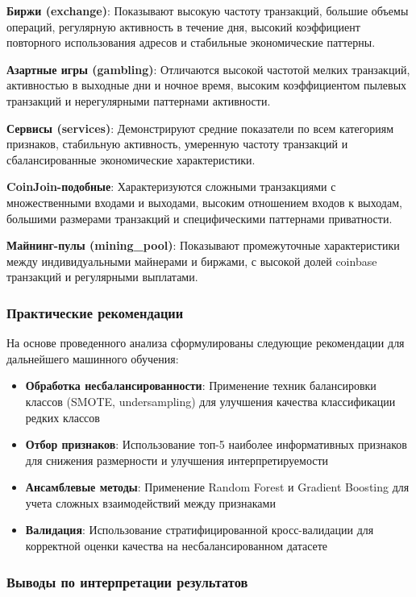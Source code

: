 \textbf{Биржи (exchange)}: Показывают высокую частоту транзакций, большие объемы операций, регулярную активность в течение дня, высокий коэффициент повторного использования адресов и стабильные экономические паттерны.

\textbf{Азартные игры (gambling)}: Отличаются высокой частотой мелких транзакций, активностью в выходные дни и ночное время, высоким коэффициентом пылевых транзакций и нерегулярными паттернами активности.

\textbf{Сервисы (services)}: Демонстрируют средние показатели по всем категориям признаков, стабильную активность, умеренную частоту транзакций и сбалансированные экономические характеристики.

\textbf{CoinJoin-подобные}: Характеризуются сложными транзакциями с множественными входами и выходами, высоким отношением входов к выходам, большими размерами транзакций и специфическими паттернами приватности.

\textbf{Майнинг-пулы (mining\_pool)}: Показывают промежуточные характеристики между индивидуальными майнерами и биржами, с высокой долей coinbase транзакций и регулярными выплатами.

\subsubsection{Практические рекомендации}

На основе проведенного анализа сформулированы следующие рекомендации для дальнейшего машинного обучения:

\begin{itemize}
    \item \textbf{Обработка несбалансированности}: Применение техник балансировки классов (SMOTE, undersampling) для улучшения качества классификации редких классов
    \item \textbf{Отбор признаков}: Использование топ-5 наиболее информативных признаков для снижения размерности и улучшения интерпретируемости
    \item \textbf{Ансамблевые методы}: Применение Random Forest и Gradient Boosting для учета сложных взаимодействий между признаками
    \item \textbf{Валидация}: Использование стратифицированной кросс-валидации для корректной оценки качества на несбалансированном датасете
\end{itemize}

\subsubsection{Выводы по интерпретации результатов}

